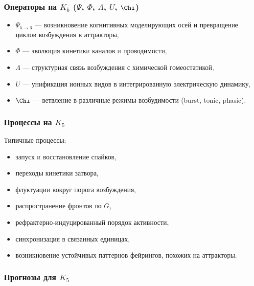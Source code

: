 \subsubsection{Операторы на \texorpdfstring{$K_5$}{K_5} (\texorpdfstring{$\Psi$}{\Psi}, \texorpdfstring{$\Phi$}{\Phi}, \texorpdfstring{$\Lambda$}{\Lambda}, \texorpdfstring{$U$}{U}, \texorpdfstring{$\Chi$}{\Chi})}

\begin{itemize}
    \item $\Psi_{5\to6}$ — возникновение когнитивных моделирующих осей и
          превращение циклов возбуждения в аттракторы,
    \item $\Phi$ — эволюция кинетики каналов и проводимости,
    \item $\Lambda$ — структурная связь возбуждения с химической
          гомеостатикой,
    \item $U$ — унификация ионных видов в интегрированную электрическую
          динамику,
    \item $\Chi$ — ветвление в различные режимы возбудимости
          (burst, tonic, phasic).
\end{itemize}

\subsubsection{Процессы на \texorpdfstring{$K_5$}{K_5}}

Типичные процессы:
\begin{itemize}
    \item запуск и восстановление спайков,
    \item переходы кинетики затвора,
    \item флуктуации вокруг порога возбуждения,
    \item распространение фронтов по $G$,
    \item рефрактерно-индуцированный порядок активности,
    \item синхронизация в связанных единицах,
    \item возникновение устойчивых паттернов фейрингов, похожих на
          аттракторы.
\end{itemize}

\subsubsection{Прогнозы для \texorpdfstring{$K_5$}{K_5}}

